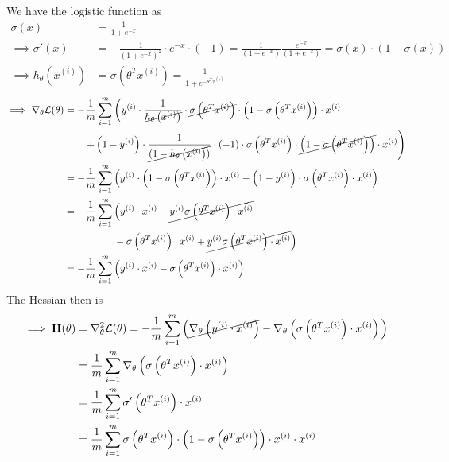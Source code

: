 We have the logistic function as
\begin{align*}
    \sigma\left(x\right)
     & =
    \frac{1}{1+e^{-x}}
    \\
    \implies
    \sigma'\left(x\right)
     & =
    -\frac{1}{\left(1+e^{-x}\right)^2} \cdot e^{-x} \cdot (-1)
    =
    \frac{1}{\left(1+e^{-x}\right)}
    \frac{e^{-x}}{\left(1+e^{-x}\right)}
    =
    \sigma\left(x\right) \cdot \left(1-\sigma\left(x\right)\right)
    \\
    \implies
    h_{\theta}\left(x^{(i)}\right)
     & =
    \sigma\left(\theta^{T} x^{(i)}\right)
    =
    \frac{1}{1+e^{-\theta^{T} x^{(i)}}}
\end{align*}
\begin{align*}
    \implies
    \nabla_{\theta} \mathcal{L}(\theta)
     & =
    -\frac{1}{m} \sum_{i=1}^{m}
    \left(
    y^{(i)}
    \cdot \frac{1}{\cancel{h_{\theta}\left(x^{(i)}\right)}}
    \cdot \cancel{\sigma\left(\theta^{T} x^{(i)}\right)}
    \cdot \left(1-\sigma\left(\theta^{T} x^{(i)}\right)\right)
    \cdot x^{(i)}
    \right.
    \\ & \qquad
    \left.
    +
    \left(1-y^{(i)}\right)
    \cdot \frac{1}{\cancel{(1-h_{\theta}\left(x^{(i)}\right))}}
    \cdot (-1)
    \cdot \sigma\left(\theta^{T} x^{(i)}\right) \cdot \cancel{\left(1-\sigma\left(\theta^{T} x^{(i)}\right)\right)}
    \cdot x^{(i)}
    \right)
    \\ & =
    -\frac{1}{m} \sum_{i=1}^{m}
    \left(
    y^{(i)} \cdot \left(1-\sigma\left(\theta^{T} x^{(i)}\right)\right) \cdot x^{(i)}
    -
    \left(1-y^{(i)}\right) \cdot \sigma\left(\theta^{T} x^{(i)}\right) \cdot x^{(i)}
    \right)
    \\ & =
    -\frac{1}{m} \sum_{i=1}^{m}
    \Big(
    y^{(i)} \cdot x^{(i)}
    -
    \cancel{y^{(i)} \sigma\left(\theta^{T} x^{(i)}\right) \cdot x^{(i)}}
    \\ & \qquad \qquad \quad
    -
    \sigma\left(\theta^{T} x^{(i)}\right) \cdot x^{(i)}
    +
    \cancel{y^{(i)} \sigma\left(\theta^{T} x^{(i)}\right) \cdot x^{(i)}}
    \Big)
    \\ & =
    -\frac{1}{m} \sum_{i=1}^{m}
    \left(
    y^{(i)} \cdot x^{(i)}
    -
    \sigma\left(\theta^{T} x^{(i)}\right) \cdot x^{(i)}
    \right)
\end{align*}
The Hessian then is
\begin{align*}
    \implies
    \mathbf{H}(\theta)
     & =
    \nabla_{\theta}^2 \mathcal{L}(\theta)
    =
    -\frac{1}{m} \sum_{i=1}^{m}
    \Big(
    \cancel{\nabla_{\theta} \left(y^{(i)} \cdot x^{(i)}\right)}
    -
    \nabla_{\theta} \left(\sigma\left(\theta^{T} x^{(i)}\right) \cdot x^{(i)}\right)
    \Big)
    \\ & =
    \frac{1}{m} \sum_{i=1}^{m}
    \nabla_{\theta} \left(\sigma\left(\theta^{T} x^{(i)}\right) \cdot x^{(i)}\right)
    \\ & =
    \frac{1}{m} \sum_{i=1}^{m}
    \sigma'\left(\theta^{T} x^{(i)}\right) \cdot x^{(i)}
    \\ & =
    \frac{1}{m} \sum_{i=1}^{m}
    \sigma\left(\theta^{T} x^{(i)}\right) \cdot \left(1-\sigma\left(\theta^{T} x^{(i)}\right)\right)
    \cdot x^{(i)}
    \cdot x^{(i)}
\end{align*}

